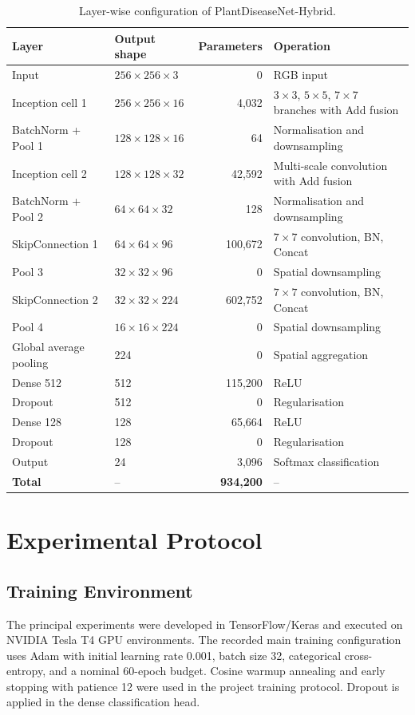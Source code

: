 \documentclass[a4paper,fleqn]{cas-dc}
\begin{document}
\begin{table}[!t]
\centering
\caption{Layer-wise configuration of PlantDiseaseNet-Hybrid.}
\label{tab:architecture}
\small
\begin{tabular}{p{3.1cm}p{3.2cm}r p{6.0cm}}
\toprule
Layer & Output shape & Parameters & Operation \\
\midrule
Input & $256\times256\times3$ & 0 & RGB input \\
Inception cell 1 & $256\times256\times16$ & 4,032 & $3\times3$, $5\times5$, $7\times7$ branches with Add fusion \\
BatchNorm + Pool 1 & $128\times128\times16$ & 64 & Normalisation and downsampling \\
Inception cell 2 & $128\times128\times32$ & 42,592 & Multi-scale convolution with Add fusion \\
BatchNorm + Pool 2 & $64\times64\times32$ & 128 & Normalisation and downsampling \\
SkipConnection 1 & $64\times64\times96$ & 100,672 & $7\times7$ convolution, BN, Concat \\
Pool 3 & $32\times32\times96$ & 0 & Spatial downsampling \\
SkipConnection 2 & $32\times32\times224$ & 602,752 & $7\times7$ convolution, BN, Concat \\
Pool 4 & $16\times16\times224$ & 0 & Spatial downsampling \\
Global average pooling & 224 & 0 & Spatial aggregation \\
Dense 512 & 512 & 115,200 & ReLU \\
Dropout & 512 & 0 & Regularisation \\
Dense 128 & 128 & 65,664 & ReLU \\
Dropout & 128 & 0 & Regularisation \\
Output & 24 & 3,096 & Softmax classification \\
\midrule
\textbf{Total} & -- & \textbf{934,200} & -- \\
\bottomrule
\end{tabular}
\end{table}

\section{Experimental Protocol}
\subsection{Training Environment}
The principal experiments were developed in TensorFlow/Keras and executed on NVIDIA Tesla T4 GPU environments. The recorded main training configuration uses Adam with initial learning rate 0.001, batch size 32, categorical cross-entropy, and a nominal 60-epoch budget. Cosine warmup annealing and early stopping with patience 12 were used in the project training protocol. Dropout is applied in the dense classification head.
\end{document}
